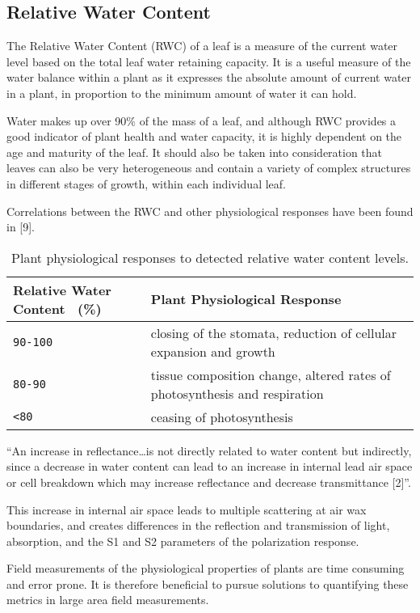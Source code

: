 \subsection{Relative Water Content}
The Relative Water Content (RWC) of a leaf is a measure of the current water level based on the total leaf water retaining capacity.  It is a useful measure of the water balance within a plant as it expresses the absolute amount of current water in a plant, in proportion to the minimum amount of water it can hold.

Water makes up over 90\% of the mass of a leaf, and although RWC provides a good indicator of plant health and water capacity, it is highly dependent on the age and maturity of the leaf.  It should also be taken into consideration that leaves can also be very heterogeneous and contain a variety of complex structures in different stages of growth, within each individual leaf.

Correlations between the RWC and other physiological responses have been found in [9].

\begin{table}[h]
  \centering
  \begin{tabular}{ll}
    \toprule
    \textbf{Relative Water Content ~(\%)}      & \textbf{Plant Physiological Response}\\
    \midrule
      \texttt{90-100}          & closing of the stomata, reduction of cellular expansion and growth\\
      \texttt{80-90}           & tissue composition change, altered rates of photosynthesis and respiration\\
      \texttt{<80}         & ceasing of photosynthesis\\
    \bottomrule
  \end{tabular}
  \caption{%
    Plant physiological responses to detected relative water content levels.
  }
  \label{tab:Packages}
\end{table}

“An increase in reflectance…is not directly related to water content but indirectly, since a decrease in water content can lead to an increase in internal lead air space or cell breakdown which may increase reflectance and decrease transmittance [2]”.

This increase in internal air space leads to multiple scattering at air wax boundaries, and creates differences in the reflection and transmission of light, absorption, and the S1 and S2 parameters of the polarization response.

Field measurements of the physiological properties of plants are time consuming and error prone.  It is therefore beneficial to pursue solutions to quantifying these metrics in large area field measurements.
